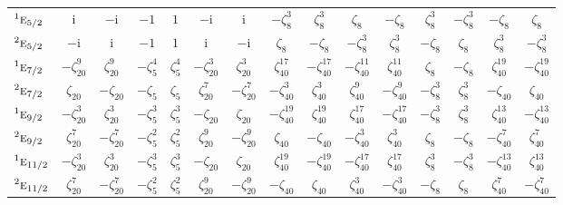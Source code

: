 \documentclass[10pt,a4paper]{article}
\numberwithin{equation}{section}
\newcommand{\irr}[1]{\text{\normalfont\scshape #1}}
\newcommand{\conjpair}[1]{{}^{#1}}
\newcommand{\iunit}{\mathrm{i}}
\newcommand{\rootunity}[1]{\zeta_{#1}}
\begin{document}
{\begin{longtable}{@{}lcccccccccccccc@{}}
$\conjpair{1}\irr{e}_{5/2}$ & $\iunit{}$ & $-\iunit{}$ & $-1$ & $1$ & $-\iunit{}$ & $\iunit{}$ & $-\rootunity{8}^{3}$ & $\rootunity{8}^{3}$ & $\rootunity{8}$ & $-\rootunity{8}$ & $\rootunity{8}^{3}$ & $-\rootunity{8}^{3}$ & $-\rootunity{8}$ & $\rootunity{8}$\\
$\conjpair{2}\irr{e}_{5/2}$ & $-\iunit{}$ & $\iunit{}$ & $-1$ & $1$ & $\iunit{}$ & $-\iunit{}$ & $\rootunity{8}$ & $-\rootunity{8}$ & $-\rootunity{8}^{3}$ & $\rootunity{8}^{3}$ & $-\rootunity{8}$ & $\rootunity{8}$ & $\rootunity{8}^{3}$ & $-\rootunity{8}^{3}$\\
$\conjpair{1}\irr{e}_{7/2}$ & $-\rootunity{20}^{9}$ & $\rootunity{20}^{9}$ & $-\rootunity{5}^{4}$ & $\rootunity{5}^{4}$ & $-\rootunity{20}^{3}$ & $\rootunity{20}^{3}$ & $\rootunity{40}^{17}$ & $-\rootunity{40}^{17}$ & $-\rootunity{40}^{11}$ & $\rootunity{40}^{11}$ & $\rootunity{8}$ & $-\rootunity{8}$ & $\rootunity{40}^{19}$ & $-\rootunity{40}^{19}$\\
$\conjpair{2}\irr{e}_{7/2}$ & $\rootunity{20}$ & $-\rootunity{20}$ & $-\rootunity{5}$ & $\rootunity{5}$ & $\rootunity{20}^{7}$ & $-\rootunity{20}^{7}$ & $-\rootunity{40}^{3}$ & $\rootunity{40}^{3}$ & $\rootunity{40}^{9}$ & $-\rootunity{40}^{9}$ & $-\rootunity{8}^{3}$ & $\rootunity{8}^{3}$ & $-\rootunity{40}$ & $\rootunity{40}$\\
$\conjpair{1}\irr{e}_{9/2}$ & $-\rootunity{20}^{3}$ & $\rootunity{20}^{3}$ & $-\rootunity{5}^{3}$ & $\rootunity{5}^{3}$ & $-\rootunity{20}$ & $\rootunity{20}$ & $-\rootunity{40}^{19}$ & $\rootunity{40}^{19}$ & $\rootunity{40}^{17}$ & $-\rootunity{40}^{17}$ & $-\rootunity{8}^{3}$ & $\rootunity{8}^{3}$ & $\rootunity{40}^{13}$ & $-\rootunity{40}^{13}$\\
$\conjpair{2}\irr{e}_{9/2}$ & $\rootunity{20}^{7}$ & $-\rootunity{20}^{7}$ & $-\rootunity{5}^{2}$ & $\rootunity{5}^{2}$ & $\rootunity{20}^{9}$ & $-\rootunity{20}^{9}$ & $\rootunity{40}$ & $-\rootunity{40}$ & $-\rootunity{40}^{3}$ & $\rootunity{40}^{3}$ & $\rootunity{8}$ & $-\rootunity{8}$ & $-\rootunity{40}^{7}$ & $\rootunity{40}^{7}$\\
$\conjpair{1}\irr{e}_{11/2}$ & $-\rootunity{20}^{3}$ & $\rootunity{20}^{3}$ & $-\rootunity{5}^{3}$ & $\rootunity{5}^{3}$ & $-\rootunity{20}$ & $\rootunity{20}$ & $\rootunity{40}^{19}$ & $-\rootunity{40}^{19}$ & $-\rootunity{40}^{17}$ & $\rootunity{40}^{17}$ & $\rootunity{8}^{3}$ & $-\rootunity{8}^{3}$ & $-\rootunity{40}^{13}$ & $\rootunity{40}^{13}$\\
$\conjpair{2}\irr{e}_{11/2}$ & $\rootunity{20}^{7}$ & $-\rootunity{20}^{7}$ & $-\rootunity{5}^{2}$ & $\rootunity{5}^{2}$ & $\rootunity{20}^{9}$ & $-\rootunity{20}^{9}$ & $-\rootunity{40}$ & $\rootunity{40}$ & $\rootunity{40}^{3}$ & $-\rootunity{40}^{3}$ & $-\rootunity{8}$ & $\rootunity{8}$ & $\rootunity{40}^{7}$ & $-\rootunity{40}^{7}$\\

\end{longtable}}
\end{document}
